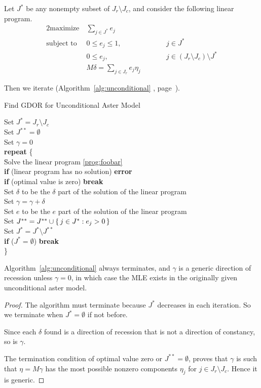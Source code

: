 Let $J^{*}$ be any nonempty subset of $J_r \setminus J_c$,
and consider the following linear program.
\begin{alignat}{2}
  \text{maximize}   & \ \sum_{j \in J^{*}} e_j
  \nonumber
  \\
  \text{subject to} & \ 0 \le e_j \le 1, & \qquad & j \in J^{*}
  \label{prog:foobar}
  \\
                    & \ 0 \le e_j, & \qquad &
                      j \in (J_r \setminus J_c) \setminus J^{*}
  \nonumber
  \\
                    & \ M \delta = \sum_{j \in J_r} e_j \eta_j
  \nonumber
\end{alignat}

Then we iterate
(Algorithm~\ref{alg:unconditional}
{, page~\pageref{alg:unconditional}).}
\begin{algorithm}
\caption{Find GDOR for Unconditional Aster Model}
\label{alg:unconditional}
\begin{tabbing}
Set $J^{*} = J_r \setminus J_c$\\
Set $J^{{*}{*}} = \emptyset$\\
Set $\gamma = 0$\\
\textbf{repeat} \{\\
\qquad \= Solve the linear program \eqref{prog:foobar}\\
\> \textbf{if} (linear program has no solution) \textbf{error}\\
\> \textbf{if} (optimal value is zero) \textbf{break}\\
\> Set $\delta$ to be the $\delta$ part of the solution of the linear program\\
\> Set $\gamma = \gamma + \delta$\\
\> Set $e$ to be the $e$ part of the solution of the linear program\\
\> Set $J^{**} = J^{**} \cup \{\, j \in J^{*} : e_j > 0 \,\}$\\
\> Set $J^{*} = J^{*} \setminus J^{{*}{*}}$\\
\> \textbf{if} ($J^{*} = \emptyset$) \textbf{break}\\
\}
\end{tabbing}
\end{algorithm}
\begin{theorem} \label{th:lin-prog-two}
Algorithm~\ref{alg:unconditional} always terminates, and $\gamma$ is
a generic direction of recession unless $\gamma = 0$, in which case
the MLE exists in the originally given unconditional aster model.
\end{theorem}
\begin{proof}
The algorithm must terminate because $J^{*}$ decreases in each iteration.
So we terminate when $J^{*} = \emptyset$ if not before.

Since each $\delta$ found is a direction of recession that is not
a direction of constancy, so is $\gamma$.

The termination condition of optimal value zero or $J^{{*}{*}} = \emptyset$,
proves that $\gamma$ is such that $\eta = M \gamma$ has the most possible
nonzero components $\eta_j$ for $j \in J_r \setminus J_c$.  Hence it
is generic.
\end{proof}
